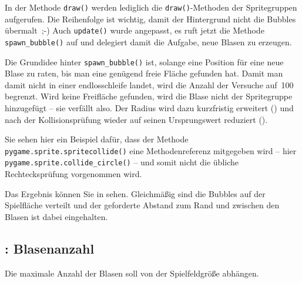 
In der Methode \texttt{draw()} werden lediglich die \texttt{draw()}-Methoden der Spritegruppen aufgerufen. Die Reihenfolge ist wichtig, damit der Hintergrund nicht die Bubbles übermalt~{;-)} Auch \texttt{update()} wurde angepasst, es ruft jetzt die Methode \texttt{spawn\_bubble()} auf und delegiert damit die Aufgabe, neue Blasen zu erzeugen.


Die Grundidee hinter \texttt{spawn\_bubble()} ist, solange eine Position für eine neue Blase zu raten, bis man eine genügend freie Fläche gefunden hat. Damit man damit nicht in einer \Gls{endlosschleife} landet, wird die Anzahl der Versuche auf~100 begrenzt. Wird keine Freifläche gefunden, wird die Blase nicht der Spritegruppe hinzugefügt -- sie verfällt also. Der Radius wird dazu kurzfristig erweitert () und nach der Kollisionsprüfung wieder auf seinen Ursprungswert reduziert (). 

Sie sehen hier ein Beispiel dafür, dass der Methode \texttt{pygame.sprite.spritecollide()} eine Methodenreferenz mitgegeben wird -- hier \texttt{pygame.sprite.collide\_circle()} --  und somit nicht die übliche Rechtecksprüfung vorgenommen wird.


Das Ergebnis können Sie in  sehen. Gleichmäßig sind die Bubbles auf der Spielfläche verteilt und der geforderte Abstand zum Rand und zwischen den Blasen ist dabei eingehalten.



\subsection{: Blasenanzahl}
	Die maximale Anzahl der Blasen soll von der Spielfeldgröße abhängen.
\er

